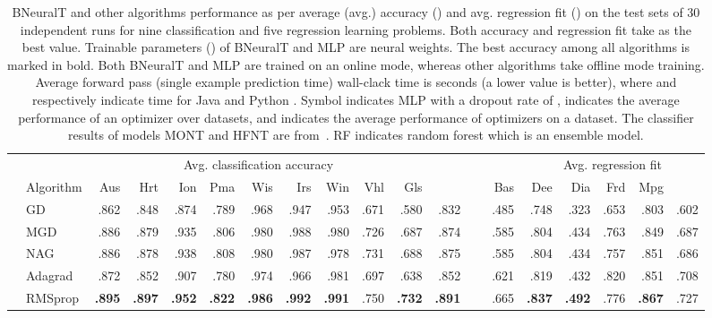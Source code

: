 \documentclass[11pt,a4paper]{article}
\begin{document}
    \begin{table} \footnotesize
        \centering
        \renewcommand{\arraystretch}{1.1}
        \setlength{\tabcolsep}{1.5pt}
        \caption{BNeuralT and other algorithms performance as per average (avg.) accuracy () and avg. regression fit () on the test sets of 30 independent runs for nine classification and five regression learning problems. Both accuracy and regression fit take  as the best value. Trainable parameters () of BNeuralT and MLP are neural weights. The best accuracy among all algorithms is marked in bold. Both BNeuralT and MLP are trained on an online mode, whereas other algorithms take offline mode training. Average forward pass (single example prediction time) wall-clack time is  seconds (a lower value is better), where  and  respectively indicate time for Java  and Python . Symbol  indicates MLP with a dropout rate of ,  indicates the average performance of an optimizer over datasets, and  indicates the average performance of optimizers on a dataset. The classifier results of models MONT and HFNT are from~\cite{ojha2020multi}. RF indicates random forest which is an ensemble model.
\label{tab:BNeuralT_all_results}}\begin{tabular}[t]{llrrrrrrrrrrrrrrrrr}
            \toprule
            & & \multicolumn{9}{c}{Avg. classification accuracy } & & & & \multicolumn{5}{c}{Avg. regression fit } \\
            \cmidrule{3-12}\cmidrule{14-19}
            & Algorithm & Aus & Hrt & Ion & Pma & Wis & Irs & Win & Vhl & Gls &  & ~ & Bas & Dee & Dia & Frd & Mpg &  \\
\midrule
            \parbox[t]{3mm}{}
            & GD & .862 & .848 & .874 & .789 & .968 & .947 & .953 & .671 & .580 & .832 &  & .485 & .748 & .323 & .653 & .803 & .602 \\
            & MGD & .886 & .879 & .935 & .806 & .980 & .988 & .980 & .726 & .687 & .874 &  & .585 & .804 & .434 & .763 & .849 & .687 \\
            & NAG & .886 & .878 & .938 & .808 & .980 & .987 & .978 & .731 & .688 & .875 &  & .585 & .804 & .434 & .757 & .851 & .686 \\
            & Adagrad & .872 & .852 & .907 & .780 & .974 & .966 & .981 & .697 & .638 & .852 &  & .621 & .819 & .432 & .820 & .851 & .708 \\
            & RMSprop & \textbf{.895} & \textbf{.897} & \textbf{.952} & \textbf{.822} & \textbf{.986} & \textbf{.992} & \textbf{.991} & .750 & \textbf{.732} & \textbf{.891} &  & .665 & \textbf{.837} & \textbf{.492} & .776 & \textbf{.867} & .727 \\

\end{tabular}
\end{table}
\end{document}
